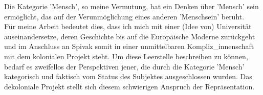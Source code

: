 Die Kategorie 'Mensch', so
meine Vermutung, hat ein Denken über 'Mensch' sein ermöglicht, das auf der
Verunmöglichung eines anderen 'Menschsein' beruht.
\\

 Für meine Arbeit bedeutet
dies, dass ich mich mit einer (Idee von) Universität auseinandersetze, deren
Geschichte bis auf die Europäische Moderne zurückgeht und im Anschluss an
Spivak somit in einer unmittelbaren Kompliz\_innenschaft mit dem kolonialen
Projekt steht. Um diese Leerstelle beschreiben zu können, bedarf es zweifellos
der Perspektiven jener, die durch die Kategorie 'Mensch' kategorisch und
faktisch vom Status des Subjektes ausgeschlossen wurden. Das dekoloniale
Projekt stellt sich diesem schwierigen Anspruch der Repräsentation.

